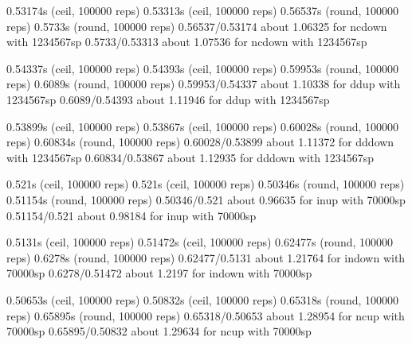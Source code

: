 0.53174s (ceil, 100000 reps)                               0.53313s (ceil, 100000 reps)                              
0.56537s (round, 100000 reps)                              0.5733s (round, 100000 reps)                              
0.56537/0.53174 about 1.06325 for ncdown with 1234567sp    0.5733/0.53313 about 1.07536 for ncdown with 1234567sp    
                                                                                                                     
0.54337s (ceil, 100000 reps)                               0.54393s (ceil, 100000 reps)                              
0.59953s (round, 100000 reps)                              0.6089s (round, 100000 reps)                              
0.59953/0.54337 about 1.10338 for ddup with 1234567sp      0.6089/0.54393 about 1.11946 for ddup with 1234567sp      
                                                                                                                     
0.53899s (ceil, 100000 reps)                               0.53867s (ceil, 100000 reps)                              
0.60028s (round, 100000 reps)                              0.60834s (round, 100000 reps)                             
0.60028/0.53899 about 1.11372 for dddown with 1234567sp    0.60834/0.53867 about 1.12935 for dddown with 1234567sp   
                                                                                                                     
0.521s (ceil, 100000 reps)                                 0.521s (ceil, 100000 reps)                                
0.50346s (round, 100000 reps)                              0.51154s (round, 100000 reps)                             
0.50346/0.521 about 0.96635 for inup with 70000sp          0.51154/0.521 about 0.98184 for inup with 70000sp         
                                                                                                                     
0.5131s (ceil, 100000 reps)                                0.51472s (ceil, 100000 reps)                              
0.62477s (round, 100000 reps)                              0.6278s (round, 100000 reps)                              
0.62477/0.5131 about 1.21764 for indown with 70000sp       0.6278/0.51472 about 1.2197 for indown with 70000sp       
                                                                                                                     
0.50653s (ceil, 100000 reps)                               0.50832s (ceil, 100000 reps)                              
0.65318s (round, 100000 reps)                              0.65895s (round, 100000 reps)                             
0.65318/0.50653 about 1.28954 for ncup with 70000sp        0.65895/0.50832 about 1.29634 for ncup with 70000sp       
                                                                                                                     
